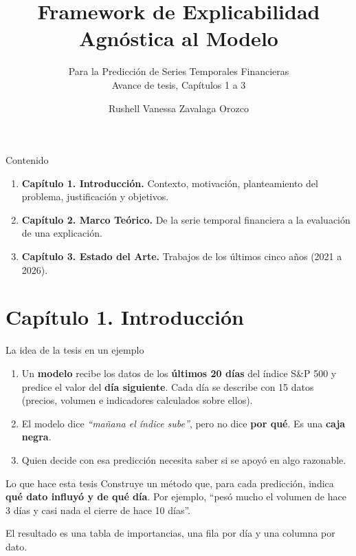 \documentclass{beamer}
\title{Framework de Explicabilidad Agnóstica al Modelo}
\subtitle{Para la Predicción de Series Temporales Financieras\\
\small Avance de tesis, Capítulos 1 a 3}
\author{Rushell Vanessa Zavalaga Orozco}
\institute{Escuela de Ciencia de la Computación\\
Universidad Nacional de San Agustín de Arequipa}
\date{}
\begin{document}
\begin{frame}
    \titlepage
\end{frame}

\begin{frame}{Contenido}
    \begin{enumerate}
        \item \textbf{Capítulo 1. Introducción.} Contexto, motivación,
        planteamiento del problema, justificación y objetivos.
        \vspace{0.3cm}
        \item \textbf{Capítulo 2. Marco Teórico.} De la serie temporal
        financiera a la evaluación de una explicación.
        \vspace{0.3cm}
        \item \textbf{Capítulo 3. Estado del Arte.} Trabajos de los
        últimos cinco años (2021 a 2026).
    \end{enumerate}
\end{frame}

\section[Capítulo 1]{Capítulo 1. Introducción}

\begin{frame}{La idea de la tesis en un ejemplo}
    \small
    \begin{enumerate}
        \item Un \textbf{modelo} recibe los datos de los \textbf{últimos
        20 días} del índice S\&P 500 y predice el valor del \textbf{día
        siguiente}. Cada día se describe con 15 datos (precios, volumen e
        indicadores calculados sobre ellos).
        \vspace{0.15cm}
        \item El modelo dice \emph{``mañana el índice sube''}, pero no dice
        \textbf{por qué}. Es una \textbf{caja negra}.
        \vspace{0.15cm}
        \item Quien decide con esa predicción necesita saber si se apoyó
        en algo razonable.
    \end{enumerate}
    \begin{block}{Lo que hace esta tesis}
        Construye un método que, para cada predicción, indica
        \textbf{qué dato influyó y de qué día}. Por ejemplo, ``pesó mucho
        el volumen de hace 3 días y casi nada el cierre de hace 10
        días''.
    \end{block}
    \begin{center}
        \footnotesize
        El resultado es una tabla de importancias, una fila por día y
        una columna por dato.
    \end{center}
\end{frame}
\end{document}
